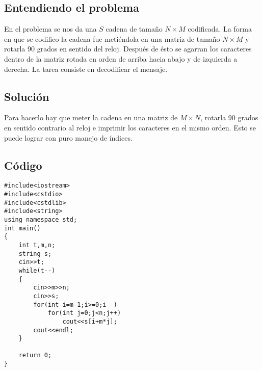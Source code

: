 \subsection*{Entendiendo el problema}
En el problema se nos da una $S$ cadena de tamaño $N\times M$ codificada. La forma en que se codifico la cadena fue metiéndola en una matriz de tamaño $N \times M$ y rotarla 90 grados en sentido del reloj. Después de ésto se agarran los caracteres dentro de la matriz rotada en orden de arriba hacia abajo y de izquierda a derecha. La tarea consiste en decodificar el mensaje.
\subsection*{Solución}
 Para hacerlo hay que meter la cadena en una matriz de $M \times N$, rotarla 90 grados en sentido contrario al reloj e imprimir los caracteres en el mismo orden. Esto se puede lograr con puro manejo de índices.
\subsection*{Código}

\begin{verbatim}
#include<iostream>
#include<cstdio>
#include<cstdlib>
#include<string>
using namespace std;
int main()
{
    int t,m,n;
    string s;
    cin>>t;
    while(t--)
    {
        cin>>m>>n;
        cin>>s;
        for(int i=m-1;i>=0;i--)
            for(int j=0;j<n;j++)
                cout<<s[i+m*j];
        cout<<endl;
    }
 
    return 0;
}
\end{verbatim}